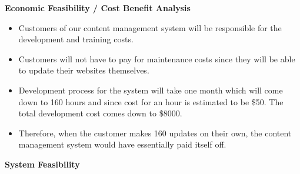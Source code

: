 \documentclass[11pt]{article}
\begin{document}
    \vspace{10 mm}

\textbf{Economic Feasibility / Cost Benefit Analysis}

\begin{itemize}
    \item Customers of our content management system will be 
    responsible for the development and training costs.
    \item Customers will not have to pay for maintenance costs since they will be able to update their websites themselves.
    \item Development process for the system will take one month which will come down to 160 hours and since cost for an
    hour is estimated to be \$50. The total development cost 
    comes down to \$8000.
    \item Therefore, when the customer makes 160 updates on their
    own, the content management system would have essentially paid itself off.
    \end{itemize}



   \vspace{10 mm}



\textbf{System Feasibility}
\end{document}
